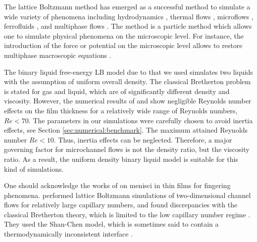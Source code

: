 \documentclass[preprint,12pt]{elsarticle}
\begin{document}
The lattice Boltzmann method has emerged as a successful method to simulate
a wide variety of phenomena including hydrodynamics \cite{yu}, thermal flows
\cite{karlin-minimalmodels}, microflows \cite{ansumali-small-knudsen},
ferrofluids \cite{kuzmin-aniso}, and multiphase flows
\cite{swift,Shan-chen:extended}. The method is a particle method which allows one to simulate physical
phenomena on the microscopic level. For instance, the introduction of the force or potential on the
microscopic level allows to restore multiphase macroscopic equations \cite{swift,
Shan-chen:extended}.

The binary liquid free-energy LB model due to \citet{swift} that we used
simulates two liquids with the assumption of uniform overall
density. %
The classical Bretherton
problem is stated for gas and liquid, which are of
significantly
different density and viscosity. However, the numerical results of
\citet{giavedoni-numerical} and \citet{heil-bretherton} show
negligible Reynolds number effects on the film thickness for a relatively wide range of Reynolds
numbers, $Re<70$. The parameters in our simulations were carefully chosen to
avoid  inertia
effects, see Section \ref{sec:numerical:benchmark}. The maximum attained
Reynolds number $Re<10$. Thus, inertia effects can be neglected. Therefore, a major governing
factor for microchannel flows is not the density ratio, but
the
viscosity ratio. As a result, the uniform density binary liquid model is suitable for this kind of
simulations.  


One should acknowledge the works of \citet{pagonabarraga-fingers} on menisci
in thin films for fingering phenomena. \citet{sehgal-microchannel} performed lattice Boltzmann
simulations of two-dimensional channel flows for relatively large capillary numbers, and
found discrepancies with the classical Bretherton theory, which
is limited to the low capillary number regime \cite{giavedoni-numerical}. They used the Shan-Chen model,
 which is sometimes said to contain a thermodynamically
inconsistent interface \cite{nourgaliev-breakup}. 
\end{document}
